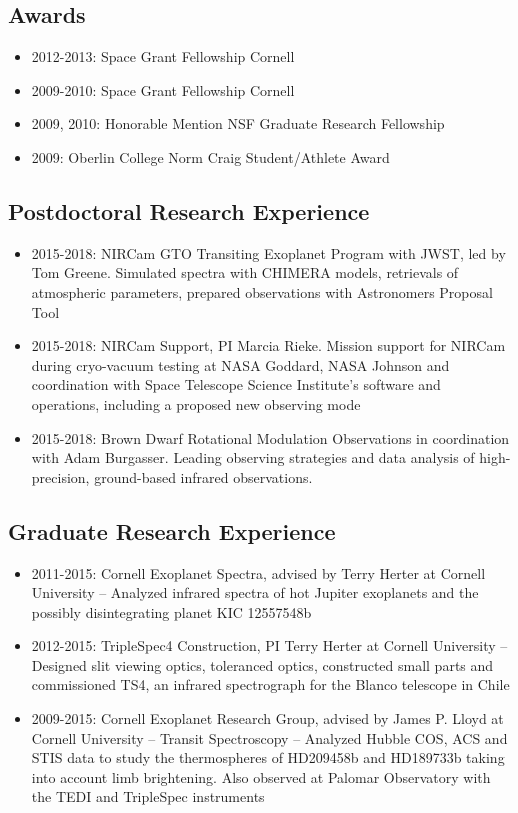 \documentclass[11pt, oneside]{article}   	%
\begin{document}
\vspace{-0.15in}
\subsection*{Awards}
\begin{itemize}[noitemsep]
        \item 2012-2013: Space Grant Fellowship Cornell
        \item 2009-2010: Space Grant Fellowship Cornell
        \item 2009, 2010: Honorable Mention NSF Graduate Research Fellowship 
        \item 2009: Oberlin College Norm Craig Student/Athlete Award
\end{itemize}

\subsection*{Postdoctoral Research Experience}
\begin{itemize}[noitemsep]
	\item 2015-2018: NIRCam GTO Transiting Exoplanet Program with JWST, led by Tom Greene. Simulated spectra with CHIMERA models, retrievals of atmospheric parameters, prepared observations with Astronomers Proposal Tool
	\item 2015-2018: NIRCam Support, PI Marcia Rieke. Mission support for NIRCam during cryo-vacuum testing at NASA Goddard, NASA Johnson and coordination with Space Telescope Science Institute's software and operations, including a proposed new observing mode
	\item 2015-2018: Brown Dwarf Rotational Modulation Observations in coordination with Adam Burgasser. Leading observing strategies and data analysis of high-precision, ground-based infrared observations.
\end{itemize}

\subsection*{Graduate Research Experience}
\begin{itemize}[noitemsep]
	\item 2011-2015: Cornell Exoplanet Spectra, advised by Terry Herter at Cornell University -- Analyzed infrared spectra of hot Jupiter exoplanets and the possibly disintegrating planet KIC 12557548b
	\item 2012-2015: TripleSpec4 Construction, PI Terry Herter at Cornell University -- Designed slit viewing optics, toleranced optics, constructed small parts and commissioned TS4, an infrared spectrograph for the Blanco telescope in Chile
	\item 2009-2015: Cornell Exoplanet Research Group, advised by James P. Lloyd at Cornell University -- Transit Spectroscopy -- Analyzed Hubble COS, ACS and STIS data to study the thermospheres of HD209458b and HD189733b taking into account limb brightening. Also observed at Palomar Observatory with the TEDI and TripleSpec instruments
\end{itemize}
\end{document}
